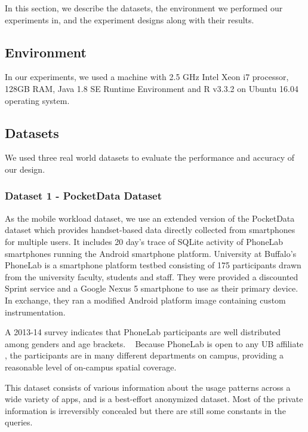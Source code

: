 
In this section, we describe the datasets, the environment we performed our experiments in, and the experiment designs along with their results.

\subsection{Environment}

In our experiments, we used a machine with 2.5 GHz Intel Xeon i7 processor, 128GB RAM, Java 1.8 SE Runtime Environment and R v3.3.2 on Ubuntu 16.04 operating system.

\subsection{Datasets}

We used three real world datasets to evaluate the performance and accuracy of our design.

\subsubsection{Dataset 1 - PocketData Dataset}
\label{sec:pocketdatadataset}

As the mobile workload dataset, we use an extended version of the PocketData~\cite{kennedy2015pocket} dataset which provides handset-based data directly collected from smartphones for multiple users.
It includes
20 day's
trace of SQLite activity of
PhoneLab~\cite{phonelab} smartphones running the Android smartphone platform. University at Buffalo's PhoneLab is a smartphone platform testbed consisting of 175 participants drawn from the university faculty, students and staff. They were provided a discounted Sprint service and a Google Nexus 5 smartphone to use as their primary device. In exchange, they ran a modified Android platform image containing custom instrumentation.

A 2013-14 survey indicates that PhoneLab participants are well distributed among genders and age brackets. ~\cite{phonelab} Because PhoneLab is open to any UB affiliate , the participants are in many different departments on campus, providing a reasonable level of on-campus spatial coverage. 

This dataset consists of various information about the usage patterns across a wide variety of apps, and is a best-effort anonymized dataset.
Most of the private information is irreversibly concealed but there are still some constants in the queries.

